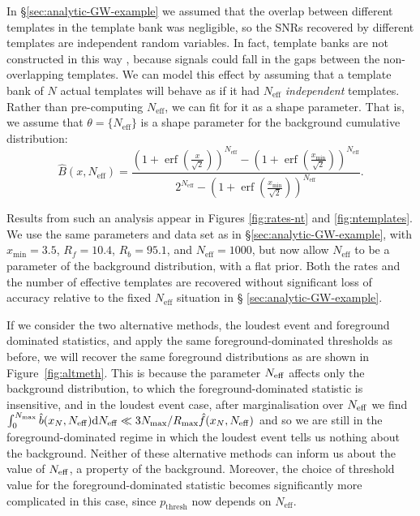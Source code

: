 \documentclass[aps,prd]{revtex4-1}
\newcommand{\xmin}{x_\mathrm{min}}
\DeclareMathOperator{\erf}{erf}
\begin{document}
In \S \ref{sec:analytic-GW-example} we assumed that the overlap
between different templates in the template bank was negligible, so
the SNRs recovered by different templates are independent random
variables.  In fact, template banks are not constructed in this way
\citep[e.g.,][]{Owen:1998dk,Ajith:2008},
because signals could fall in the gaps between the non-overlapping
templates.  We can model this effect by assuming that a template bank
of $N$ actual templates will behave as if it had $N_\mathrm{eff}$
\emph{independent} templates.  Rather than pre-computing
$N_\mathrm{eff}$, we can fit for it as a shape parameter.  That is, we
assume that $\theta = \{N_\mathrm{eff}\}$ is a shape parameter for the
background cumulative distribution:
\begin{equation}
  \hat{B}\left(x, N_\mathrm{eff}\right) = \frac{\left( 1 + \erf\left(
    \frac{x}{\sqrt{2}} \right) \right)^{N_\mathrm{eff}} - \left( 1 +
    \erf\left( \frac{\xmin}{\sqrt{2}} \right)
    \right)^{N_\mathrm{eff}}}{2^{N_\mathrm{eff}} - \left( 1 +
    \erf\left( \frac{\xmin}{\sqrt{2}} \right) \right)^{N_\mathrm{eff}}
  }.
\end{equation}

Results from such an analysis appear in Figures \ref{fig:rates-nt} and
\ref{fig:ntemplates}.  We use the same parameters and data set as in
\S \ref{sec:analytic-GW-example}, with $x_\mathrm{min} = 3.5$, $R_f =
10.4$, $R_b = 95.1$, and $N_\mathrm{eff} = 1000$, but now allow
$N_\mathrm{eff}$ to be a parameter of the background distribution,
with a flat prior.  Both the rates and the number of effective
templates are recovered without significant loss of accuracy relative
to the fixed $N_\mathrm{eff}$ situation in \S
\ref{sec:analytic-GW-example}.

If we consider the two alternative methods, the loudest event and
foreground dominated statistics, and apply the same
foreground-dominated thresholds as before, we will recover the same
foreground distributions as are shown in Figure~\ref{fig:altmeth}.
This is because the parameter $N_{\rm eff}$ affects only the
background distribution, to which the foreground-dominated statistic
is insensitive, and in the loudest event case, after marginalisation
over $N_{\rm eff}$ we find $\int_0^{N_{\rm max}} \hat{b}(x_N,N_{\rm
  eff}) {\rm d}N_{\rm eff} \ll 3 N_{\rm max}/R_{\rm max} \hat{f}(x_N,
N_{\rm eff})$ and so we are still in the foreground-dominated regime
in which the loudest event tells us nothing about the background.
Neither of these alternative methods can inform us about the value of
$N_{\rm eff}$, a property of the background.  Moreover, the choice of
threshold value for the foreground-dominated statistic becomes
significantly more complicated in this case, since $p_\mathrm{thresh}$
now depends on $N_\mathrm{eff}$.
\end{document}
